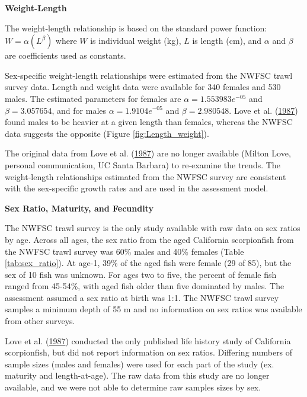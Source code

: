 \documentclass[12pt,]{article}
\begin{document}
\vspace{.5cm}

\textbf{Weight-Length}

The weight-length relationship is based on the standard power function:
\(W = \alpha(L^\beta)\) where \(W\) is individual weight (kg), \(L\) is
length (cm), and \(\alpha\) and \(\beta\) are coefficients used as
constants.

Sex-specific weight-length relationships were estimated from the NWFSC
trawl survey data. Length and weight data were available for 340 females
and 530 males. The estimated parameters for females are
\(\alpha = 1.553983e^{-05}\) and \(\beta = 3.057654\), and for males
\(\alpha = 1.9104e^{-05}\) and \(\beta = 2.980548\). Love et al.
(\protect\hyperlink{ref-Love1987}{1987}) found males to be heavier at a
given length than females, whereas the NWFSC data suggests the opposite
(Figure \ref{fig:Length_weight}).

The original data from Love et al.
(\protect\hyperlink{ref-Love1987}{1987}) are no longer available (Milton
Love, personal communication, UC Santa Barbara) to re-examine the
trends. The weight-length relationships estimated from the NWFSC survey
are consistent with the sex-specific growth rates and are used in the
assessment model.

\vspace{.5cm}

\textbf{Sex Ratio, Maturity, and Fecundity}

The NWFSC trawl survey is the only study available with raw data on sex
ratios by age. Across all ages, the sex ratio from the aged California
scorpionfish from the NWFSC trawl survey was 60\% males and 40\% females
(Table \ref{tab:sex_ratio}). At age-1, 39\% of the aged fish were female
(29 of 85), but the sex of 10 fish was unknown. For ages two to five,
the percent of female fish ranged from 45-54\%, with aged fish older
than five dominated by males. The assessment assumed a sex ratio at
birth was 1:1. The NWFSC trawl survey samples a minimum depth of 55 m
and no information on sex ratios was available from other surveys.

Love et al. (\protect\hyperlink{ref-Love1987}{1987}) conducted the only
published life history study of California scorpionfish, but did not
report information on sex ratios. Differing numbers of sample sizes
(males and females) were used for each part of the study (ex. maturity
and length-at-age). The raw data from this study are no longer
available, and we were not able to determine raw samples sizes by sex.
\end{document}
